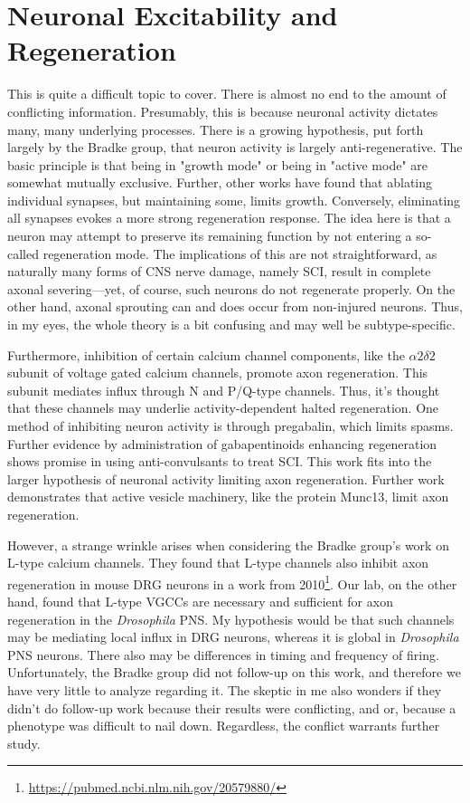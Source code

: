 \documentclass[12pt]{report}
\begin{document}
\section{Neuronal Excitability and Regeneration}

This is quite a difficult topic to cover. There is almost no end to the amount of conflicting information. Presumably, this is because neuronal activity dictates many, many underlying processes. There is a growing hypothesis, put forth largely by the Bradke group, that neuron activity is largely anti-regenerative. The basic principle is that being in "growth mode" or being in "active mode" are somewhat mutually exclusive. Further, other works have found that ablating individual synapses, but maintaining some, limits growth. Conversely, eliminating all synapses evokes a more strong regeneration response. The idea here is that a neuron may attempt to preserve its remaining function by not entering a so-called regeneration mode. The implications of this are not straightforward, as naturally many forms of CNS nerve damage, namely SCI, result in complete axonal severing---yet, of course, such neurons do not regenerate properly. On the other hand, axonal sprouting can and does occur from non-injured neurons. Thus, in my eyes, the whole theory is a bit confusing and may well be subtype-specific.\newline

Furthermore, inhibition of certain calcium channel components, like the $\alpha2\delta2$ subunit of voltage gated calcium channels, promote axon regeneration. This subunit mediates influx through N and P/Q-type channels. Thus, it's thought that these channels may underlie activity-dependent halted regeneration. One method of inhibiting neuron activity is through pregabalin, which limits spasms. Further evidence by administration of gabapentinoids enhancing regeneration shows promise in using anti-convulsants to treat SCI. This work fits into the larger hypothesis of neuronal activity limiting axon regeneration. Further work demonstrates that active vesicle machinery, like the protein Munc13, limit axon regeneration.\newline

However, a strange wrinkle arises when considering the Bradke group's work on L-type calcium channels. They found that L-type channels also inhibit axon regeneration in mouse DRG neurons in a work from 2010\footnote{\url{https://pubmed.ncbi.nlm.nih.gov/20579880/}}. Our lab, on the other hand, found that L-type VGCCs are necessary and sufficient for axon regeneration in the \textit{Drosophila} PNS. My hypothesis would be that such channels may be mediating local influx in DRG neurons, whereas it is global in \textit{Drosophila} PNS neurons. There also may be differences in timing and frequency of firing. Unfortunately, the Bradke group did not follow-up on this work, and therefore we have very little to analyze regarding it. The skeptic in me also wonders if they didn't do follow-up work because their results were conflicting, and or, because a phenotype was difficult to nail down. Regardless, the conflict warrants further study. 
\end{document}
